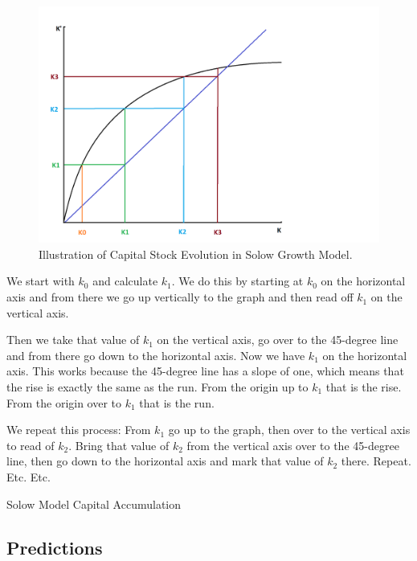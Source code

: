 \documentclass[
]{book}
\begin{document}
\begin{figure}

{\centering \includegraphics[width=1\linewidth]{img/growth/k3} 

}

\caption{Illustration of Capital Stock Evolution in Solow Growth Model.}\label{fig:growth04}
\end{figure}

We start with \(k_0\) and calculate \(k_1\). We do this by starting at \(k_0\) on the horizontal axis and from there we go up vertically to the graph and then read off \(k_1\) on the vertical axis.

Then we take that value of \(k_1\) on the vertical axis, go over to the 45-degree line and from there go down to the horizontal axis. Now we have \(k_1\) on the horizontal axis. This works because the 45-degree line has a slope of one, which means that the rise is exactly the same as the run. From the origin up to \(k_1\) that is the rise. From the origin over to \(k_1\) that is the run.

We repeat this process: From \(k_1\) go up to the graph, then over to the vertical axis to read of \(k_2\). Bring that value of \(k_2\) from the vertical axis over to the 45-degree line, then go down to the horizontal axis and mark that value of \(k_2\) there.
Repeat.
Etc.
Etc.

Solow Model Capital Accumulation

\hypertarget{predictions}{%
\subsection{Predictions}\label{predictions}}
\end{document}
